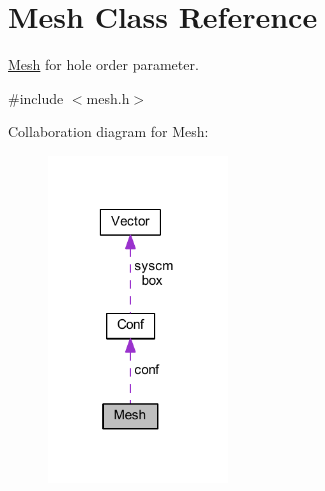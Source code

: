 \hypertarget{class_mesh}{\section{Mesh Class Reference}
\label{class_mesh}
}


\hyperlink{class_mesh}{Mesh} for hole order parameter.  




{\ttfamily \#include $<$mesh.\+h$>$}



Collaboration diagram for Mesh\+:\nopagebreak
\begin{figure}[H]
\begin{center}
\leavevmode
\includegraphics[width=135pt]{class_mesh__coll__graph}
\end{center}
\end{figure}
